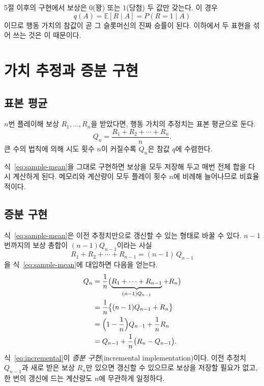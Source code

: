 \documentclass[11pt,a4paper]{article}
\newcommand{\qt}{q}                       %
\newcommand{\Qe}{Q}                       %
\newcommand{\E}{\mathbb{E}}
\begin{document}
5절 이후의 구현에서 보상은 $0$(꽝) 또는 $1$(당첨) 두 값만 갖는다. 이 경우
\begin{equation}
  \qt(A) = \E[R\mid A] = P(R=1\mid A)
\end{equation}
이므로 행동 가치의 참값이 곧 그 슬롯머신의 진짜 승률이 된다. 이하에서 두 표현을 섞어 쓰는 것은
이 때문이다.

\section{가치 추정과 증분 구현}

\subsection{표본 평균}

$n$번 플레이해 보상 $R_1,\dots,R_n$을 받았다면, 행동 가치의 추정치는 표본 평균으로 둔다.
\begin{equation}
  \Qe_n = \frac{R_1+R_2+\cdots+R_n}{n}.
  \label{eq:sample-mean}
\end{equation}
큰 수의 법칙에 의해 시도 횟수 $n$이 커질수록 $\Qe_n$은 참값 $\qt$에 수렴한다.

식~\eqref{eq:sample-mean}을 그대로 구현하면 보상을 모두 저장해 두고 매번 전체 합을 다시 계산하게
된다. 메모리와 계산량이 모두 플레이 횟수 $n$에 비례해 늘어나므로 비효율적이다.

\subsection{증분 구현}

식~\eqref{eq:sample-mean}은 이전 추정치만으로 갱신할 수 있는 형태로 바꿀 수 있다. $n-1$번까지의
보상 총합이 $(n-1)\Qe_{n-1}$이라는 사실
\begin{equation}
  R_1+R_2+\cdots+R_{n-1} = (n-1)\,\Qe_{n-1}
  \label{eq:partial-sum}
\end{equation}
을 식~\eqref{eq:sample-mean}에 대입하면 다음을 얻는다.
\begin{align}
  \Qe_n &= \frac{1}{n}\bigl(\underbrace{R_1+\cdots+R_{n-1}}_{(n-1)\Qe_{n-1}} + R_n\bigr) \label{eq:inc-1}\\
        &= \frac{1}{n}\bigl\{(n-1)\Qe_{n-1} + R_n\bigr\} \nonumber\\
        &= \Bigl(1-\frac{1}{n}\Bigr)\Qe_{n-1} + \frac{1}{n}R_n \label{eq:inc-2}\\
        &= \Qe_{n-1} + \frac{1}{n}\bigl(R_n - \Qe_{n-1}\bigr). \label{eq:incremental}
\end{align}
식~\eqref{eq:incremental}이 \emph{증분 구현}(incremental implementation)이다. 이전 추정치 $\Qe_{n-1}$과
새로 받은 보상 $R_n$만 있으면 갱신할 수 있으므로 보상을 저장할 필요가 없고, 한 번의 갱신에 드는
계산량도 $n$에 무관하게 일정하다.
\end{document}
